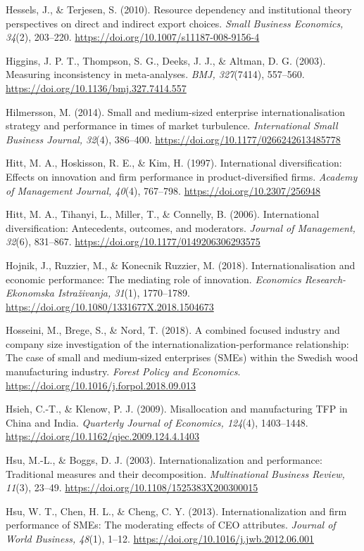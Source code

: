\documentclass[
  a4paper,
  13pt]{extreport}
\begin{document}
Hessels, J., \& Terjesen, S. (2010). Resource dependency and
institutional theory perspectives on direct and indirect export choices.
\emph{Small Business Economics, 34}(2), 203--220.
\url{https://doi.org/10.1007/s11187-008-9156-4}

Higgins, J. P. T., Thompson, S. G., Deeks, J. J., \& Altman, D. G.
(2003). Measuring inconsistency in meta-analyses. \emph{BMJ, 327}(7414),
557--560. \url{https://doi.org/10.1136/bmj.327.7414.557}

Hilmersson, M. (2014). Small and medium-sized enterprise
internationalisation strategy and performance in times of market
turbulence. \emph{International Small Business Journal, 32}(4),
386--400. \url{https://doi.org/10.1177/0266242613485778}

Hitt, M. A., Hoskisson, R. E., \& Kim, H. (1997). International
diversification: Effects on innovation and firm performance in
product-diversified firms. \emph{Academy of Management Journal, 40}(4),
767--798. \url{https://doi.org/10.2307/256948}

Hitt, M. A., Tihanyi, L., Miller, T., \& Connelly, B. (2006).
International diversification: Antecedents, outcomes, and moderators.
\emph{Journal of Management, 32}(6), 831--867.
\url{https://doi.org/10.1177/0149206306293575}

Hojnik, J., Ruzzier, M., \& Konecnik Ruzzier, M. (2018).
Internationalisation and economic performance: The mediating role of
innovation. \emph{Economics Research-Ekonomska Istraživanja, 31}(1),
1770--1789. \url{https://doi.org/10.1080/1331677X.2018.1504673}

Hosseini, M., Brege, S., \& Nord, T. (2018). A combined focused industry
and company size investigation of the internationalization-performance
relationship: The case of small and medium-sized enterprises (SMEs)
within the Swedish wood manufacturing industry. \emph{Forest Policy and
Economics}. \url{https://doi.org/10.1016/j.forpol.2018.09.013}

Hsieh, C.-T., \& Klenow, P. J. (2009). Misallocation and manufacturing
TFP in China and India. \emph{Quarterly Journal of Economics, 124}(4),
1403--1448. \url{https://doi.org/10.1162/qjec.2009.124.4.1403}

Hsu, M.-L., \& Boggs, D. J. (2003). Internationalization and
performance: Traditional measures and their decomposition.
\emph{Multinational Business Review, 11}(3), 23--49.
\url{https://doi.org/10.1108/1525383X200300015}

Hsu, W. T., Chen, H. L., \& Cheng, C. Y. (2013). Internationalization
and firm performance of SMEs: The moderating effects of CEO attributes.
\emph{Journal of World Business, 48}(1), 1--12.
\url{https://doi.org/10.1016/j.jwb.2012.06.001}
\end{document}
